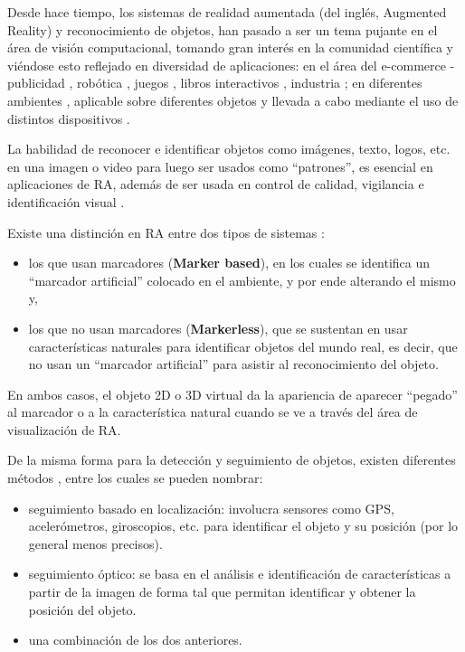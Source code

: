 Desde hace tiempo, los sistemas de realidad aumentada (del inglés, Augmented Reality) y reconocimiento de objetos,
han pasado a ser un tema pujante en el área de visión computacional, tomando gran 
interés en la comunidad científica y viéndose esto reflejado en diversidad de aplicaciones:
en el área del e-commerce - publicidad  \cite{5478308}, robótica \cite{conf/icra/2010}, juegos \cite{5711053,Azuma:2001:RAA:616073.618862}, libros interactivos \cite{KimPW09},
industria \cite{conf/visapp/BenhimaneNGGNM08}; en diferentes ambientes \cite{conf/ismar/KleinM07, Takacs:2008:OAR:1460096.1460165, conf/ismar/MiyashitaMTOESGGAL08}, aplicable sobre diferentes objetos 
\cite{conf/ismar/2007, Lepetit:2005:MMT:1166405.1166406, conf/iswc/2007} y llevada a cabo mediante el uso de distintos dispositivos \cite{WagnerRMDS10}.

La habilidad de reconocer e identificar objetos como imágenes, texto, logos, etc. en una imagen o video para luego ser usados como ``patrones'', es esencial en aplicaciones de RA, además de ser usada en control de calidad, vigilancia e identificación visual \cite{5739718}.

Existe una distinción en RA entre dos tipos de sistemas \cite{1320421}: 
\begin{itemize}
 \item los que usan marcadores (\textbf{Marker based}), en los cuales se identifica un ``marcador artificial'' colocado en el ambiente, y por ende alterando el mismo y,
 \item los que no usan marcadores (\textbf{Markerless}), que se sustentan en usar características naturales para identificar objetos del mundo real, es decir, que no usan un ``marcador artificial'' para asistir al reconocimiento del objeto.
\end{itemize}
En ambos casos, el objeto 2D o 3D virtual da la apariencia de aparecer ``pegado'' al marcador o a la característica natural cuando se ve a través del área de visualización de RA.

De la misma forma para la detección y seguimiento de objetos, existen diferentes métodos \cite{1320421}, entre los cuales se pueden nombrar:
\begin{itemize}
 \item seguimiento basado en localización: involucra sensores como GPS, acelerómetros, giroscopios, etc. para identificar el objeto y su posición (por lo general menos precisos).
 \item seguimiento óptico: se basa en el análisis e identificación de características a partir de la imagen de forma tal que permitan identificar y obtener la posición del objeto.
 \item una combinación de los dos anteriores.
\end{itemize}

